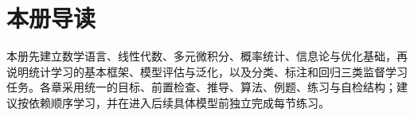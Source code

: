 \documentclass[UTF8,a4paper,11pt,openany]{ctexbook}
\begin{document}
\frontmatter
\SLMakeTitle
\chapter*{本册导读}
本册先建立数学语言、线性代数、多元微积分、概率统计、信息论与优化基础，再说明统计学习的基本框架、模型评估与泛化，以及分类、标注和回归三类监督学习任务。各章采用统一的目标、前置检查、推导、算法、例题、练习与自检结构；建议按依赖顺序学习，并在进入后续具体模型前独立完成每节练习。
\SLPrintContents
\SLPrintSymbolIndex
\SLPrintFoundationRoutes
\mainmatter
{}











\backmatter
\SLPrintAlgorithmContractAppendix
\printbookindexes
\end{document}
